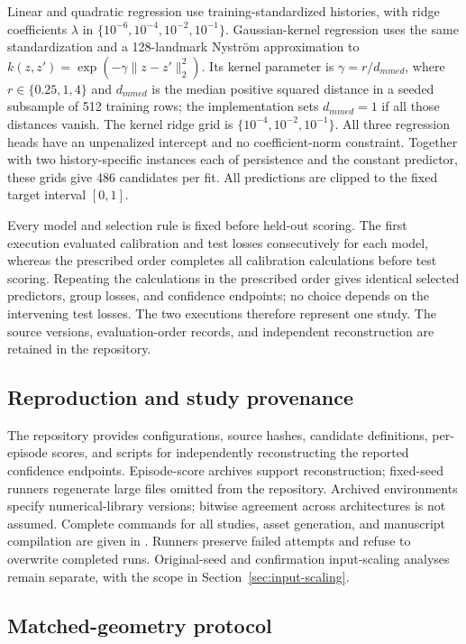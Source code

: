 Linear and quadratic regression use training-standardized histories, with
ridge coefficients $\lambda$ in $\{10^{-6},10^{-4},10^{-2},10^{-1}\}$.
Gaussian-kernel regression
uses the same standardization and a 128-landmark Nystr\"om approximation to
$k(z,z')=\exp(-\gamma\|z-z'\|_2^2)$. Its kernel parameter is
$\gamma=r/d_{
m med}$, where $r\in\{0.25,1,4\}$ and $d_{
m med}$ is the
median positive squared distance in a seeded subsample of 512 training rows;
the implementation sets $d_{
m med}=1$ if all those distances vanish. The
kernel ridge grid is $\{10^{-4},10^{-2},10^{-1}\}$. All three regression
heads have an unpenalized intercept and no coefficient-norm constraint.
Together with two history-specific instances each of persistence and the
constant predictor, these grids give 486 candidates per fit. All predictions
are clipped to the fixed target interval $[0,1]$.

Every model and selection rule is fixed before held-out scoring. The first
execution evaluated calibration and test losses consecutively for each model,
whereas the prescribed order completes all calibration calculations before
test scoring. Repeating the calculations in the prescribed order gives
identical selected predictors, group losses, and confidence endpoints; no
choice depends on the intervening test losses. The two executions therefore
represent one study. The source versions, evaluation-order records, and
independent reconstruction are retained in the repository.

\subsection{Reproduction and study provenance}

The repository provides configurations, source hashes, candidate definitions,
per-episode scores, and scripts for independently reconstructing the reported
confidence endpoints. Episode-score archives support
reconstruction; fixed-seed runners regenerate large files omitted from the
repository. Archived environments specify numerical-library versions;
bitwise agreement across architectures is not assumed. Complete commands for
all studies, asset generation, and manuscript compilation are given in
. Runners preserve failed attempts and refuse to
overwrite completed runs. Original-seed and confirmation input-scaling
analyses remain separate, with the scope in Section~\ref{sec:input-scaling}.

\subsection{Matched-geometry protocol}
\label{app:matched-geometry}

